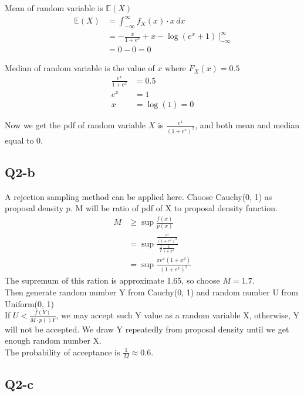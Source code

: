 \documentclass[12pt,letterpaper]{article}
\begin{document}
\noindent Mean of random variable is $\mathbb{E}(X)$
\begin{align*}
\mathbb{E}(X) &= \int_{-\infty}^{\infty} f_X(x) \cdot x \, dx \\
&= - \frac{x}{1 + e^x} + x - \log(e^x + 1) \, |_{-\infty}^{\infty}\\
&= 0 - 0 = 0
\end{align*}

\noindent Median of random variable is the value of $x$ where $F_X(x) = 0.5$
\begin{align*}
\frac{e^x}{1 + e^x} &= 0.5 \\
e^x &= 1 \\
x &= \log(1) = 0
\end{align*}

\noindent Now we get the pdf of random variable $X$ is $\frac{e^x}{(1+e^x)^2}$, and both mean and median equal to 0.

\subsection*{Q2-b}
\noindent A rejection sampling method can be applied here. Choose Cauchy(0, 1) as proposal density $p$. M will be ratio of pdf of X to proposal density function.
\begin{align*}
M &\geq \sup \frac{f(x)}{p(x)} \\
&= \sup \frac{\frac{e^x}{(1 + e^x)^2}}{\frac{1}{\pi}\frac{1}{1 + x^2}} \\
&= \sup \frac{\pi e^x (1+x^2)}{(1+e^x)^2}
\end{align*} 
\noindent The supremum of this ration is approximate 1.65, so choose $M = 1.7$. \\

\noindent Then generate random number Y from Cauchy(0, 1) and random number U from Uniform(0, 1) \\

\noindent If $U < \frac{f(Y)}{M \cdot p()Y}$, we may accept such Y value as a random variable X, otherwise, Y will not be accepted. We draw Y repeatedly from proposal density until we get enough random number X. \\

\noindent The probability of acceptance is $\frac{1}{M} \approx 0.6$.\\

\subsection*{Q2-c}
\end{document}
